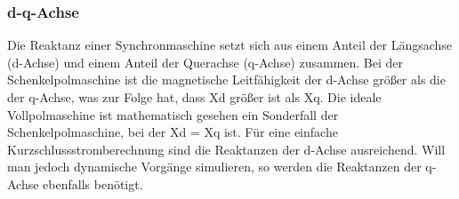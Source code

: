 \documentclass{scrartcl}
\begin{document}
\begin{onehalfspace}
\subsubsection{d-q-Achse}
Die Reaktanz einer Synchronmaschine setzt sich aus einem Anteil der Längsachse (d-Achse) und einem Anteil der Querachse (q-Achse) zusammen. Bei der Schenkelpolmaschine ist die magnetische Leitfähigkeit der d-Achse größer als die der q-Achse, was zur Folge hat, dass Xd größer ist als Xq. Die ideale Vollpolmaschine ist mathematisch gesehen ein Sonderfall der Schenkelpolmaschine, bei der Xd = Xq ist. Für eine einfache Kurzschlussstromberechnung sind die Reaktanzen der d-Achse ausreichend. Will man jedoch dynamische Vorgänge simulieren, so werden die Reaktanzen der q-Achse ebenfalls benötigt. \\


\end{onehalfspace}
\end{document}
